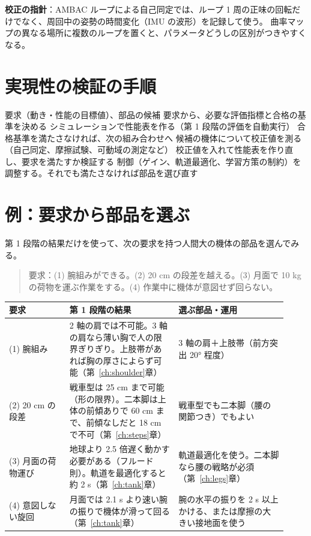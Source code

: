 \begin{keypoint}
\textbf{校正の指針}：AMBAC ループによる自己同定では、ループ 1 周の正味の回転だけでなく、周回中の姿勢の時間変化（IMU の波形）を記録して使う。
曲率マップの異なる場所に複数のループを置くと、パラメータどうしの区別がつきやすくなる。
\end{keypoint}

\section{実現性の検証の手順}

\begin{algorithm}[htbp]
\caption{アセンブル型の設計・校正・検証}
\begin{algorithmic}[1]
\Require 要求（動き・性能の目標値）、部品の候補
\State 要求から、必要な評価指標と合格の基準を決める
  \State シミュレーションで性能表を作る（第 1 段階の評価を自動実行）
  \State 合格基準を満たさなければ、次の組み合わせへ
\EndFor
\State 候補の機体について校正値を測る（自己同定、摩擦試験、可動域の測定など）
\State 校正値を入れて性能表を作り直し、要求を満たすか検証する
  \State 制御（ゲイン、軌道最適化、学習方策の制約）を調整する。それでも満たさなければ部品を選び直す
\EndIf
\end{algorithmic}
\end{algorithm}

\section{例：要求から部品を選ぶ}

第 1 段階の結果だけを使って、次の要求を持つ人間大の機体の部品を選んでみる。

\begin{quote}
要求：(1) 腕組みができる。(2) 20 cm の段差を越える。(3) 月面で 10 kg の荷物を運ぶ作業をする。(4) 作業中に機体が意図せず回らない。
\end{quote}

\begin{longtable}{p{0.20\linewidth}p{0.36\linewidth}p{0.36\linewidth}}
\toprule
要求 & 第 1 段階の結果 & 選ぶ部品・運用 \\ \midrule \endhead
(1) 腕組み & 2 軸の肩では不可能。3 軸の肩なら薄い胸で人の限界ぎりぎり。上肢帯があれば胸の厚さによらず可能（第~\ref{ch:shoulder}章） & 3 軸の肩＋上肢帯（前方突出 20° 程度） \\
(2) 20 cm の段差 & 戦車型は 25 cm まで可能（形の限界）。二本脚は上体の前傾ありで 60 cm まで、前傾なしだと 18 cm で不可（第~\ref{ch:steps}章） & 戦車型でも二本脚（腰の関節つき）でもよい \\
(3) 月面の荷物運び & 地球より 2.5 倍遅く動かす必要がある（フルード則）。軌道を最適化すると約 2 s（第~\ref{ch:tank}章） & 軌道最適化を使う。二本脚なら腰の戦略が必須（第~\ref{ch:legs}章） \\
(4) 意図しない旋回 & 月面では 2.1 s より速い腕の振りで機体が滑って回る（第~\ref{ch:tank}章） & 腕の水平の振りを 2 s 以上かける、または摩擦の大きい接地面を使う \\
\bottomrule
\end{longtable}

